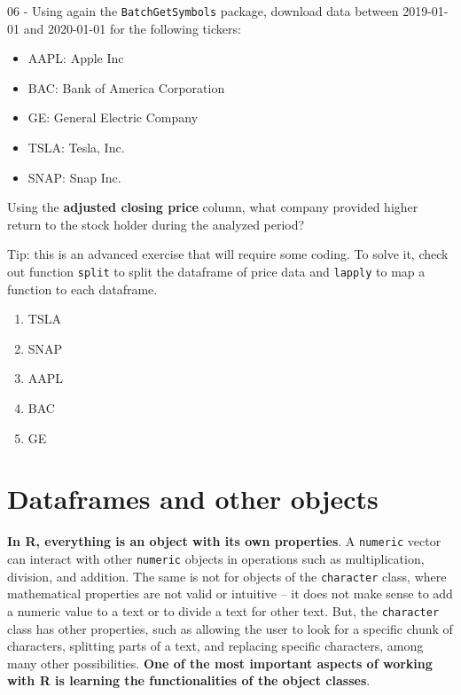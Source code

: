 \documentclass[
  12pt,
]{book}
\providecommand{\tightlist}{%
  \setlength{\itemsep}{0pt}\setlength{\parskip}{0pt}}
\begin{document}
06 -
Using again the \texttt{BatchGetSymbols} package, download data between 2019-01-01 and 2020-01-01 for the following tickers:

\begin{itemize}
\tightlist
\item
  AAPL: Apple Inc
\item
  BAC: Bank of America Corporation
\item
  GE: General Electric Company
\item
  TSLA: Tesla, Inc.
\item
  SNAP: Snap Inc.
\end{itemize}

Using the \textbf{adjusted closing price} column, what company provided higher return to the stock holder during the analyzed period?

Tip: this is an advanced exercise that will require some coding. To solve it, check out function \texttt{split} to split the dataframe of price data and \texttt{lapply} to map a function to each dataframe.

\begin{enumerate}
\def\labelenumi{\alph{enumi})}
\tightlist
\item
  TSLA
\item
  SNAP
\item
  AAPL
\item
  BAC
\item
  GE
\end{enumerate}

\hypertarget{data-structure-objects}{%
\chapter{Dataframes and other objects}\label{data-structure-objects}}

\textbf{In R, everything is an object with its own properties}. A \texttt{numeric} vector can interact with other \texttt{numeric} objects in operations such as multiplication, division, and addition. The same is not for objects of the \texttt{character} class, where mathematical properties are not valid or intuitive -- it does not make sense to add a numeric value to a text or to divide a text for other text. But, the \texttt{character} class has other properties, such as allowing the user to look for a specific chunk of characters, splitting parts of a text, and replacing specific characters, among many other possibilities. \textbf{One of the most important aspects of working with R is learning the functionalities of the object classes}.
\end{document}
